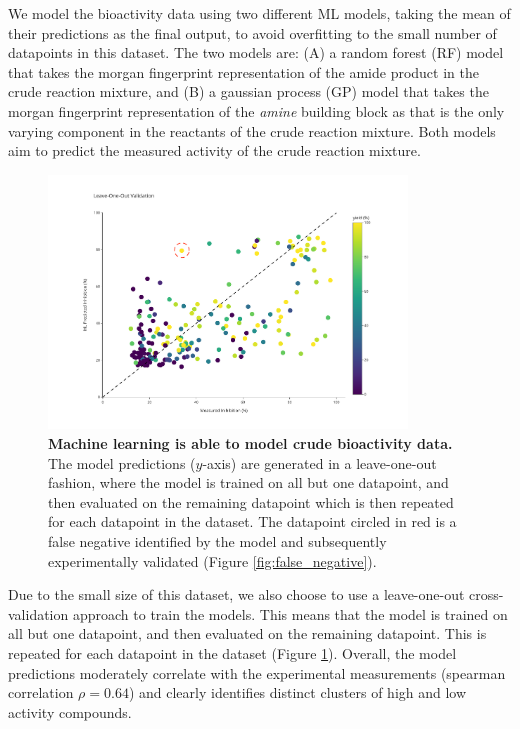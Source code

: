 We model the bioactivity data using two different ML models, taking the mean of their predictions as the final output, to avoid overfitting to the small number of datapoints in this dataset. The two models are: (A) a random forest (RF) model that takes the morgan fingerprint representation of the amide product in the crude reaction mixture, and (B) a gaussian process (GP) model that takes the morgan fingerprint representation of the \textit{amine} building block as that is the only varying component in the reactants of the crude reaction mixture. Both models aim to predict the measured activity of the crude reaction mixture.

\begin{figure}[!t]
    \centering
    \includegraphics[width=0.85\textwidth]{Chapters/Crude/Figs/rf_loo_flat.pdf}
    \caption{\textbf{Machine learning is able to model crude bioactivity data.} The model predictions ($y$-axis) are generated in a leave-one-out fashion, where the model is trained on all but one datapoint, and then evaluated on the remaining datapoint which is then repeated for each datapoint in the dataset. The datapoint circled in red is a false negative identified by the model and subsequently experimentally validated (Figure \ref{fig:false_negative}).}
    \label{fig:leave-one-out}
\end{figure}


Due to the small size of this dataset, we also choose to use a leave-one-out cross-validation approach to train the models. This means that the model is trained on all but one datapoint, and then evaluated on the remaining datapoint. This is repeated for each datapoint in the dataset (Figure \ref{fig:leave-one-out}). Overall, the model predictions moderately correlate with the experimental measurements (spearman correlation $\rho =0.64$) and clearly identifies distinct clusters of high and low activity compounds. 

